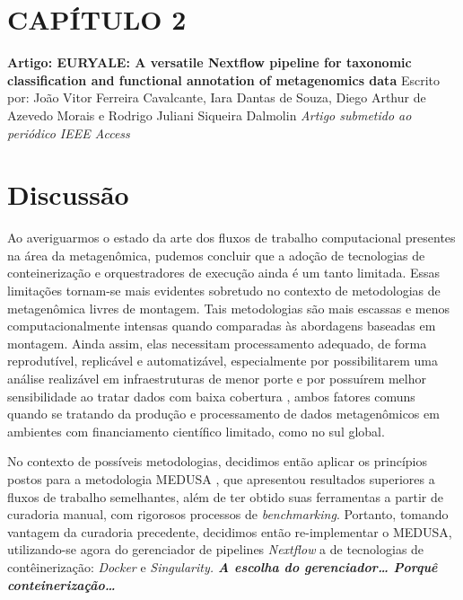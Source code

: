 \documentclass[
	12pt,				%
	oneside,			%
	a4paper,			%
	chapter=TITLE,		%
	section=TITLE,		%
	english,			%
	brazil				%
	]{abntex2}
\begin{document}
\chapter*{CAPÍTULO 2}\label{cap2}
\begin{center}
\textbf{Artigo: EURYALE: A versatile Nextflow pipeline for taxonomic classification and functional annotation of metagenomics data}
\bigskip\newline
Escrito por: João Vitor Ferreira Cavalcante, Iara Dantas de Souza, Diego Arthur de Azevedo Morais e Rodrigo Juliani Siqueira Dalmolin
\bigskip\newline
\textit{Artigo submetido ao periódico IEEE Access}

\end{center}
\begin{fichacatalografica}
    
\end{fichacatalografica}
\chapter{Discussão}\label{disc}

Ao averiguarmos o estado da arte dos fluxos de trabalho computacional presentes na área da metagenômica, pudemos concluir que a adoção de tecnologias de conteinerização e orquestradores de execução ainda é um tanto limitada.
Essas limitações tornam-se mais evidentes sobretudo no contexto de metodologias de metagenômica livres de montagem.
Tais metodologias são mais escassas e menos computacionalmente intensas quando comparadas às abordagens baseadas em montagem.
Ainda assim, elas necessitam processamento adequado, de forma reprodutível, replicável e automatizável, especialmente por possibilitarem uma análise realizável em infraestruturas de menor porte e por possuírem melhor sensibilidade ao tratar dados com baixa cobertura \autocite{ayling2020}, ambos fatores comuns quando se tratando da produção e processamento de dados metagenômicos em ambientes com financiamento científico limitado, como no sul global.

No contexto de possíveis metodologias, decidimos então aplicar os princípios postos para a metodologia MEDUSA \autocite{morais2022}, que apresentou resultados superiores a fluxos de trabalho semelhantes, além de ter obtido suas ferramentas a partir de curadoria manual, com rigorosos processos de \emph{benchmarking}.
Portanto, tomando vantagem da curadoria precedente, decidimos então re-implementar o MEDUSA, utilizando-se agora do gerenciador de pipelines \emph{Nextflow} a de tecnologias de contêinerização: \emph{Docker} e \emph{Singularity. \textbf{A escolha do gerenciador\ldots{} Porquê conteinerização\ldots{}}}
\end{document}
